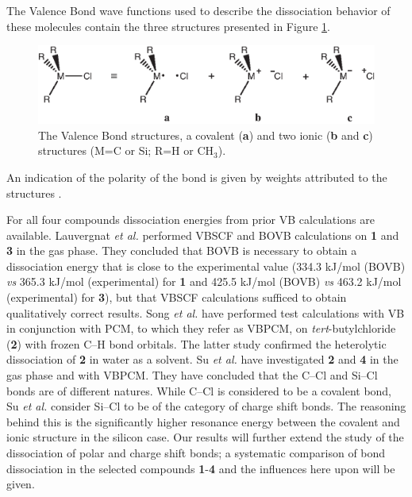 The Valence Bond wave functions used to describe the dissociation behavior of these molecules contain the three structures presented in Figure \ref{ch3.fig.structures}.
\begin{figure}[htbp]
\begin{center}
\includegraphics{dissociation/figures/structures.eps}
\end{center}
\caption{The Valence Bond structures, a covalent (\textbf{a}) and two ionic (\textbf{b} and \textbf{c}) structures (M=C or Si; R=H or CH$_3$).}
\label{ch3.fig.structures}
\end{figure}
An indication of the polarity of the bond is given by weights attributed to the structures \cite{coulson}. 

For all four compounds dissociation energies from prior VB calculations are available. Lauvergnat \textit{et al.} \cite{lauvergnat} performed VBSCF \cite{vbscf1,vbscf2} and BOVB \cite{bovb1,bovb2,bovb3} calculations on \textbf{1} and \textbf{3} in the gas phase. They concluded that BOVB is necessary to obtain a dissociation energy that is close to the experimental value (334.3 kJ/mol (BOVB) \textit{vs} 365.3 kJ/mol (experimental) for \textbf{1} and 425.5 kJ/mol (BOVB) \textit{vs} 463.2 kJ/mol (experimental) for \textbf{3}), but that VBSCF calculations sufficed to obtain qualitatively correct results.  Song \textit{et al.} \cite{song} have performed test calculations with VB in conjunction with PCM, to which they refer as VBPCM, on \textit{tert}-butylchloride (\textbf{2}) with frozen C--H bond orbitals. The latter study confirmed the heterolytic dissociation of \textbf{2} in water as a solvent. Su \textit{et al.} \cite{psu} have investigated \textbf{2} and \textbf{4} in the gas phase and with VBPCM. They have concluded that the C--Cl and Si--Cl bonds are of different natures. While C--Cl is considered to be a covalent bond, Su \textit{et al.} consider Si--Cl to be of the category of charge shift bonds. The reasoning behind this is the significantly higher resonance energy between the covalent and ionic structure in the silicon case. Our results will further extend the study of the dissociation of polar and charge shift bonds; a systematic comparison of bond dissociation in the selected compounds \textbf{1}-\textbf{4} and the influences here upon will be given.

